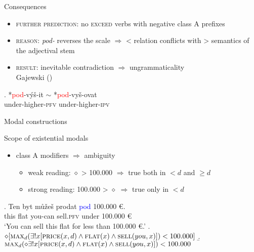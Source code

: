 \documentclass[12pt]{beamer}
\begin{document}
\begin{frame}{Consequences}

\begin{itemize}
\item \textsc{further prediction}: no \textsc{exceed} verbs with negative class A prefixes
\item \textsc{reason}: \textit{pod-} reverses the scale $\Rightarrow$ < relation conflicts with > semantics of the adjectival stem
\item \textsc{result}: inevitable contradiction $\Rightarrow$ ungrammaticality\\\scriptsize Gajewski (\citeyear{gajewski2002analycity})\normalsize
\end{itemize}

\exg. *{\textcolor{red}{pod}-výš-it $\sim$} *\textcolor{red}{pod}-vyš-ovat\\
under-higher-\textsc{pfv} under-higher-\textsc{ipv}\\

\end{frame}

\begin{frame}{Modal constructions}

Scope of existential modals

\begin{itemize}
\item class A modifiers $\Rightarrow$ ambiguity
\begin{itemize}
\item weak reading: $\diamond$ > 100.000 $\Rightarrow$ true both in $< d$ and $\geq d$
\item strong reading: 100.000 > $\diamond$ $\Rightarrow$ true only in $< d$ 
\end{itemize}
\end{itemize}

\exg. Ten byt můžeš prodat \textcolor{blue}{pod} 100.000 {\euro}.\label{ex:classA-ambiguity}\\
this flat you-can sell.\textsc{pfv} under 100.000 {\euro}\\
`You can sell this flat for less than 100.000 {\euro}.'
\a. $\diamond[\textsc{max}_d(\exists !x[\textsc{price}(x,d) \wedge \textsc{flat}(x) \wedge \textsc{sell}(you,x)]) < 100.000]$\label{ex:classA-weak}
\b. $\textsc{max}_d(\diamond \exists ! x[\textsc{price}(x,d) \wedge \textsc{flat}(x) \wedge \textsc{sell}(you,x)]) < 100.000$\label{ex:classA-strong}


\end{frame}
\end{document}
